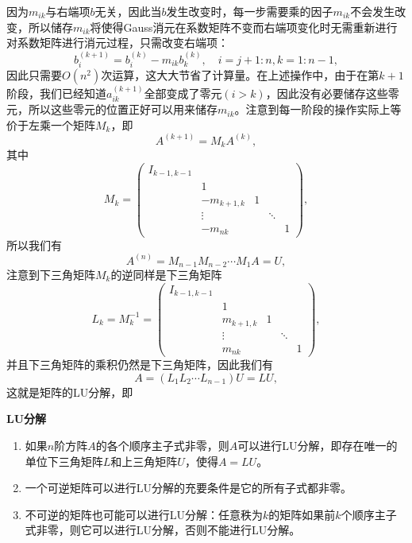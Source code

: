 \documentclass[a4paper,10pt]{ctexart}
\begin{document}
因为$ m_{ik} $与右端项$ b $无关，因此当$ b $发生改变时，每一步需要乘的因子$ m_{ik} $不会发生改变，所以储存$ m_{ik} $将使得Gauss消元在系数矩阵不变而右端项变化时无需重新进行对系数矩阵进行消元过程，只需改变右端项：
\[
    b_i^{(k+1)} = b_i^{(k)} - m_{ik} b_k^{(k)},\quad i = j+1:n, k=1:n-1,
\]
因此只需要$ O(n^2) $次运算，这大大节省了计算量。在上述操作中，由于在第$ k+1 $阶段，我们已经知道$ a^{(k+1)}_{ik} $全部变成了零元$ (i>k) $，因此没有必要储存这些零元，所以这些零元的位置正好可以用来储存$ m_{ik} $。注意到每一阶段的操作实际上等价于左乘一个矩阵$ M_k $，即
\[
    A^{(k+1)} = M_k A^{(k)},  
\]
其中
\[
    M_k =
    \begin{pmatrix}
        I_{k-1,k-1} & & & & \\
        & 1 & & & \\
        & -m_{k+1,k} & 1 & &\\
        & \vdots & & \ddots &\\
        & -m_{nk} & & & 1
    \end{pmatrix},
\]
所以我们有
\begin{equation}
    A^{(n)} = M_{n-1}M_{n-2}\cdots M_1 A = U,
\end{equation}
注意到下三角矩阵$ M_k $的逆同样是下三角矩阵
\[
    L_k = M_k^{-1} =
    \begin{pmatrix}
        I_{k-1,k-1} & & & & \\
        & 1 & & & \\
        & m_{k+1,k} & 1 & &\\
        & \vdots & & \ddots &\\
        & m_{nk} & & & 1
    \end{pmatrix},
\]
并且下三角矩阵的乘积仍然是下三角矩阵，因此我们有
\begin{equation}
    A = (L_{1}L_{2}\cdots L_{n-1})U = LU,
\end{equation}
这就是矩阵的LU分解，即
\begin{theorem}\label{thm:LU}\bf{\textup{LU分解}}
    \begin{enumerate}
        \item 如果$ n $阶方阵$ A $的各个顺序主子式非零，则$ A $可以进行LU分解，即存在唯一的单位下三角矩阵$ L $和上三角矩阵$ U $，使得$ A = LU $。
        \item 一个可逆矩阵可以进行LU分解的充要条件是它的所有子式都非零。
        \item 不可逆的矩阵也可能可以进行LU分解：任意秩为$ k $的矩阵如果前$ k $个顺序主子式非零，则它可以进行LU分解，否则不能进行LU分解。
    \end{enumerate}
\end{theorem}
\end{document}
